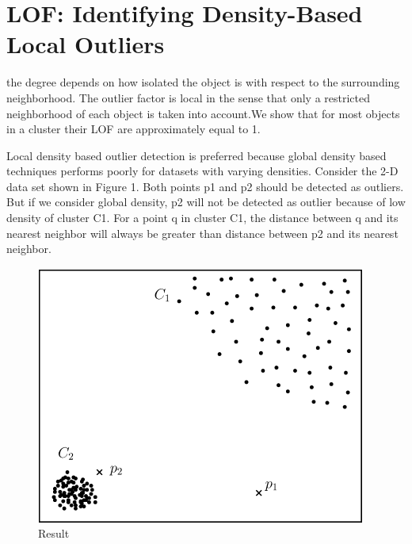 \section{LOF: Identifying Density-Based Local Outliers}

the degree depends on how isolated the object is with respect to the
surrounding neighborhood. The outlier factor is local
in the sense that only a restricted neighborhood of each object is
taken into account.We show that for most objects in a cluster
their LOF are approximately equal to 1.

\par 
Local density based outlier detection is preferred because global density based techniques performs poorly for datasets with varying densities.
Consider the 2-D data set shown in Figure 1. Both points p1 and p2 should be detected as outliers. But if we consider global density, p2 will not be detected as outlier because of low density of cluster C1. For a point q in cluster C1, the distance between q and its nearest neighbor will always be greater than distance between p2 and its nearest neighbor.

\begin{figure}[t]
	\centering
	\includegraphics{chap01/localvsglobal.png}
	\caption{Result}
\end{figure}

